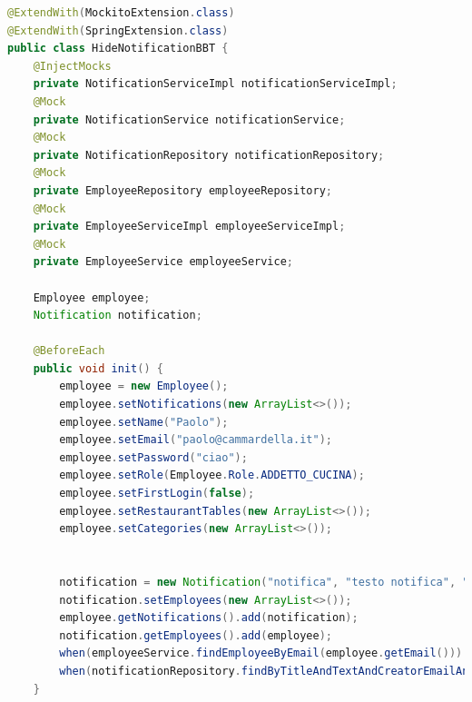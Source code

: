 \begin{lstlisting}[language=java]
@ExtendWith(MockitoExtension.class)
@ExtendWith(SpringExtension.class)
public class HideNotificationBBT {
    @InjectMocks
    private NotificationServiceImpl notificationServiceImpl;
    @Mock
    private NotificationService notificationService;
    @Mock
    private NotificationRepository notificationRepository;
    @Mock
    private EmployeeRepository employeeRepository;
    @Mock
    private EmployeeServiceImpl employeeServiceImpl;
    @Mock
    private EmployeeService employeeService;

    Employee employee;
    Notification notification;

    @BeforeEach
    public void init() {
        employee = new Employee();
        employee.setNotifications(new ArrayList<>());
        employee.setName("Paolo");
        employee.setEmail("paolo@cammardella.it");
        employee.setPassword("ciao");
        employee.setRole(Employee.Role.ADDETTO_CUCINA);
        employee.setFirstLogin(false);
        employee.setRestaurantTables(new ArrayList<>());
        employee.setCategories(new ArrayList<>());


        notification = new Notification("notifica", "testo notifica", "12/03/1999", "paolo@cammardella.it");
        notification.setEmployees(new ArrayList<>());
        employee.getNotifications().add(notification);
        notification.getEmployees().add(employee);
        when(employeeService.findEmployeeByEmail(employee.getEmail())).thenReturn(employee);
        when(notificationRepository.findByTitleAndTextAndCreatorEmailAndDate(notification.getTitle(), notification.getText(), notification.getCreatorEmail(), notification.getDate())).thenReturn(notification);
    }

\end{lstlisting}
\newpage
